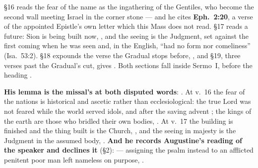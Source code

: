 \begin{witnessnote}
 \S16 reads
the fear of the name as the ingathering of the Gentiles, who become the second
wall meeting Israel in the corner stone --- and he cites \textbf{Eph.~2:20},
a verse of the appointed Epistle's own letter which this Mass does not read.
\S17 reads a future: Sion is being built now, , and the
seeing is the Judgment, set against the first coming when he was seen  and, in the  English,
``had no form nor comeliness'' (Isa.~53:2). \S18 expounds
the verse the Gradual stops before, , and
\S19, three verses past the Gradual's cut, gives . Both sections fall inside Sermo~I, before the
heading .
\end{witnessnote}

\begin{witnessnote}
\textbf{His lemma is the missal's at both disputed words}: . At v.~16 the fear of
the nations is historical and ascetic rather than ecclesiological: the true Lord
was not feared while the world served idols, and after the saving advent
; the kings of the earth are those who
bridled their own bodies, . At v.~17 the building is
finished and the thing built is the Church, , and the seeing in majesty is the Judgment in the
assumed body, . \textbf{And he records
Augustine's reading of the speaker and declines it} (\S2):  --- assigning the psalm instead to an
afflicted penitent poor man left nameless on purpose, .
\end{witnessnote}

